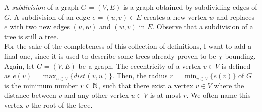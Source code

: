 A \textit{subdivision} of a graph $G=(V,E)$ is a graph obtained by subdividing edges of $G$. A subdivision of an edge $e=(u,v)\in E$ creates a new vertex $w$ and replaces $e$ with two new edges $(u,w)$ and $(w,v)$ in $E$. Observe that a subdivision of a tree is still a tree.
\\[2ex]
For the sake of the completeness of this collection of definitions, I want to add a final one, since it is used to describe some trees already proven to be $\chi$-bounding. Again, let $G=(V,E)$ be a graph. The eccentricity of a vertex $v\in V$ is defined as $\displaystyle e(v)=\max_{u \in V}\lbrace dist(v,u)\rbrace$. Then, the radius $\displaystyle r= \min_{v\in V}\lbrace e(v)\rbrace$ of $G$ is the minimum number $r\in\mathbb{N}$, such that there exist a vertex $v\in V$ where the distance between $v$ and any other vertex $u\in V$ is at most $r$. We often name this vertex $v$ the root of the tree.